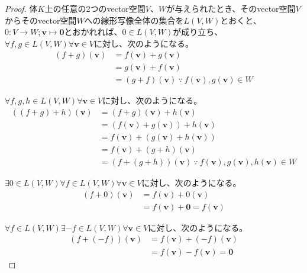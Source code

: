 \documentclass[dvipdfmx]{jsarticle}
\begin{document}
\begin{proof}
体$K$上の任意の2つのvector空間$V$、$W$が与えられたとき、そのvector空間$V$からそのvector空間$W$への線形写像全体の集合を$L(V,W)$とおくと、$0:V \rightarrow W;\mathbf{v} \mapsto \mathbf{0}$とおかれれば、$0 \in L(V,W)$が成り立ち、$\forall f,g \in L(V,W)\forall\mathbf{v} \in V$に対し、次のようになる。
\begin{align*}
(f + g)\left( \mathbf{v} \right) &= f\left( \mathbf{v} \right) + g\left( \mathbf{v} \right)\\
&= g\left( \mathbf{v} \right) + f\left( \mathbf{v} \right)\\
&= (g + f)\left( \mathbf{v} \right)\ \because\ f\left( \mathbf{v} \right),g\left( \mathbf{v} \right) \in W
\end{align*}\par
$\forall f,g,h \in L(V,W)\forall\mathbf{v} \in V$に対し、次のようになる。
\begin{align*}
\left( (f + g) + h \right)\left( \mathbf{v} \right) &= (f + g)\left( \mathbf{v} \right) + h\left( \mathbf{v} \right)\\
&= \left( f\left( \mathbf{v} \right) + g\left( \mathbf{v} \right) \right) + h\left( \mathbf{v} \right)\\
&= f\left( \mathbf{v} \right) + \left( g\left( \mathbf{v} \right) + h\left( \mathbf{v} \right) \right)\\
&= f\left( \mathbf{v} \right) + (g + h)\left( \mathbf{v} \right)\\
&= \left( f + (g + h) \right)\left( \mathbf{v} \right)\ \because\ f\left( \mathbf{v} \right),g\left( \mathbf{v} \right),h\left( \mathbf{v} \right) \in W
\end{align*}\par
$\exists 0 \in L(V,W)\forall f \in L(V,W)\forall\mathbf{v} \in V$に対し、次のようになる。
\begin{align*}
(f + 0)\left( \mathbf{v} \right) &= f\left( \mathbf{v} \right) + 0\left( \mathbf{v} \right)\\
&= f\left( \mathbf{v} \right) + \mathbf{0} = f\left( \mathbf{v} \right)
\end{align*}\par
$\forall f \in L(V,W)\exists - f \in L(V,W)\forall\mathbf{v} \in V$に対し、次のようになる。
\begin{align*}
\left( f + ( - f) \right)\left( \mathbf{v} \right) &= f\left( \mathbf{v} \right) + ( - f)\left( \mathbf{v} \right)\\
&= f\left( \mathbf{v} \right) - f\left( \mathbf{v} \right) = \mathbf{0}

\end{align*}
\end{proof}
\end{document}
